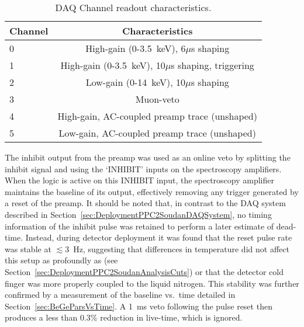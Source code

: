 	\begin{table}
		\centering
		\begin{tabular}{l c}
			\toprule
			Channel & Characteristics \\
			\midrule
			0 & High-gain (0-3.5~keV), 6$\mu$s shaping \\
			1 & High-gain (0-3.5~keV), 10$\mu$s shaping, triggering \\
			2 & Low-gain (0-14~keV), 10$\mu$s shaping \\
			3 & Muon-veto \\
			4 & High-gain, AC-coupled preamp trace (unshaped) \\
			5 & Low-gain, AC-coupled preamp trace (unshaped) \\
			\bottomrule
		\end{tabular}
		\caption[DAQ Channel readout characteristics]
		{DAQ Channel readout characteristics. }
		\label{tab:SoudanDAQTable}
	\end{table}

The inhibit output from the preamp was used as an online veto by splitting the inhibit signal and using the `INHIBIT' inputs on the spectroscopy amplifiers.  When the logic is active on this INHIBIT input, the spectroscopy amplifier maintains the baseline of its output, effectively removing any trigger generated by a reset of the preamp.  It should be noted that, in contrast to the DAQ system described in Section~\ref{sec:DeploymentPPC2SoudanDAQSystem}, no timing information of the inhibit pulse was retained to perform a later estimate of dead-time.  Instead, during detector deployment it was found that the reset pulse rate was stable at $\lesssim$3~Hz, suggesting that differences in temperature did not affect this setup as profoundly as  (see Section~\ref{sec:DeploymentPPC2SoudanAnalysisCuts}) or that the detector cold finger was more properly coupled to the liquid nitrogen.  This stability was further confirmed by a measurement of the baseline vs.~time detailed in Section~\ref{sec:BeGeParsVsTime}.
A 1~ms veto following the pulse reset then produces a less than 0.3\% reduction in live-time, which is ignored.  %

